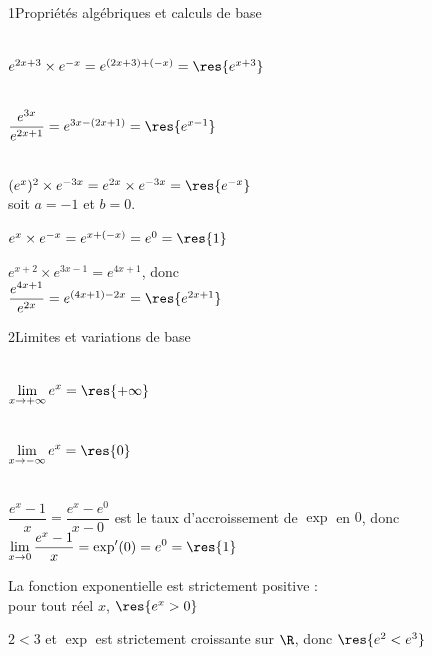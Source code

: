 

\begin{deuxcolonnes}

\begin{corrige}{1}{Propriétés algébriques et calculs de base}
\begin{questions}
  \item {}\\
    $e^{2x+3}\times e^{-x}=e^{(2x+3)+(-x)}=\res{e^{x+3}}$
  \item {}\\
    $\dfrac{e^{3x}}{e^{2x+1}}=e^{3x-(2x+1)}=\res{e^{x-1}}$
  \item {}\\
    $(e^{x})^{2}\times e^{-3x}=e^{2x}\times e^{-3x}=\res{e^{-x}}$\\
    soit $a=-1$ et $b=0$.
  \item $e^{x}\times e^{-x}=e^{x+(-x)}=e^{0}=\res{1}$
  \item $e^{x+2}\times e^{3x-1}=e^{4x+1}$, donc\\
    $\dfrac{e^{4x+1}}{e^{2x}}=e^{(4x+1)-2x}=\res{e^{2x+1}}$
\end{questions}
\end{corrige}

\begin{corrige}{2}{Limites et variations de base}
\begin{questions}
  \item {}\\
    $\displaystyle\lim_{x\to+\infty}e^{x}=\res{+\infty}$
  \item {}\\
    $\displaystyle\lim_{x\to-\infty}e^{x}=\res{0}$
  \item {}\\
    $\dfrac{e^{x}-1}{x}=\dfrac{e^{x}-e^{0}}{x-0}$ est le taux d'accroissement de $\exp$ en $0$, donc\\
    $\displaystyle\lim_{x\to0}\frac{e^{x}-1}{x}=\exp'(0)=e^{0}=\res{1}$
  \item La fonction exponentielle est strictement positive :\\
    pour tout réel $x$, $\res{e^{x}>0}$
  \item $2<3$ et $\exp$ est strictement croissante sur $\R$, donc $\res{e^{2}<e^{3}}$
\end{questions}
\end{corrige}


\end{deuxcolonnes}

